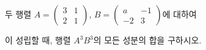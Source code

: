 \hspace*{2mm}\begin{minipage}[t]{\dimexpr\linewidth-2mm\relax}\vspace{0pt}
두 행렬 $A=\begin{pmatrix} 3 & 1 \\ 2 & 1 \end{pmatrix}$, $B=\begin{pmatrix} a & -1 \\ -2 & 3 \end{pmatrix}$에 대하여 \par\smallskip{}\par\smallskip\noindent 이 성립할 때, 행렬 $A^3B^3$의 모든 성분의 합을 구하시오.\end{minipage}
